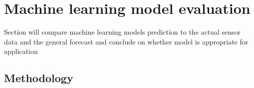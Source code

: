 \section{Machine learning model evaluation}

Section will compare machine learning models prediction to the actual sensor
data and the general forecast and conclude on whether model is appropriate for
application

\subsection{Methodology}

